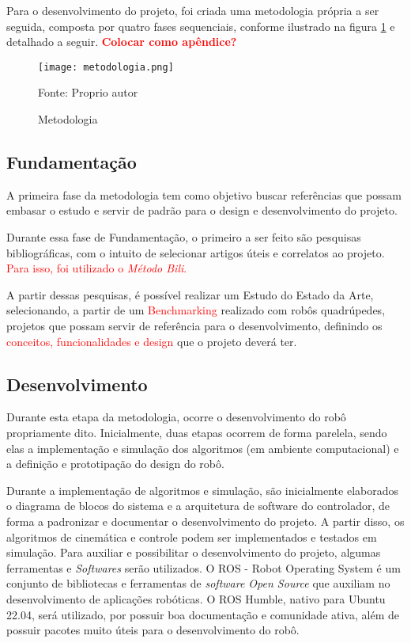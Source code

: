 \documentclass[../main.tex]{subfiles}
\begin{document}
  Para o desenvolvimento do projeto, foi criada uma metodologia própria a ser seguida, composta por quatro fases sequenciais, conforme ilustrado na figura \ref{fig:metodologia} e detalhado a seguir. \textbf{\textcolor{red}{Colocar como apêndice?}}

  \begin{figure}[h]
    \centering
    \caption{Metodologia}
    \texttt{[image: metodologia.png]}

    Fonte: Proprio autor
    \label{fig:metodologia}
  \end{figure}

  \subsection{Fundamentação}
  A primeira fase da metodologia tem como objetivo buscar referências que possam embasar o estudo e servir de padrão para o design e desenvolvimento do projeto.

  Durante essa fase de Fundamentação, o primeiro a ser feito são pesquisas bibliográficas, com o intuito de selecionar artigos úteis e correlatos ao projeto. \textcolor{red}{Para isso, foi utilizado o \textit{Método Bili}.}

  A partir dessas pesquisas, é possível realizar um Estudo do Estado da Arte, selecionando, a partir de um \textcolor{red}{Benchmarking} realizado com robôs quadrúpedes, projetos que possam servir de referência para o desenvolvimento, definindo os \textcolor{red}{conceitos, funcionalidades e design} que o projeto deverá ter.

  \subsection{Desenvolvimento}
  Durante esta etapa da metodologia, ocorre o desenvolvimento do robô propriamente dito. Inicialmente, duas etapas ocorrem de forma parelela, sendo elas a implementação e simulação dos algoritmos (em ambiente computacional) e a definição e prototipação do design do robô.

  Durante a implementação de algoritmos e simulação, são inicialmente elaborados o diagrama de blocos do sistema e a arquitetura de software do controlador, de forma a padronizar e documentar o desenvolvimento do projeto. A partir disso, os algoritmos de cinemática e controle podem ser implementados e testados em simulação. Para auxiliar e possibilitar o desenvolvimento do projeto, algumas ferramentas e \textit{Softwares} serão utilizados. O ROS - Robot Operating System é um conjunto de bibliotecas e ferramentas de \textit{software Open Source} que auxiliam no desenvolvimento de aplicações robóticas. O ROS Humble, nativo para Ubuntu 22.04, será utilizado, por possuir boa documentação e comunidade ativa, além de possuir pacotes muito úteis para o desenvolvimento do robô. 
\end{document}
